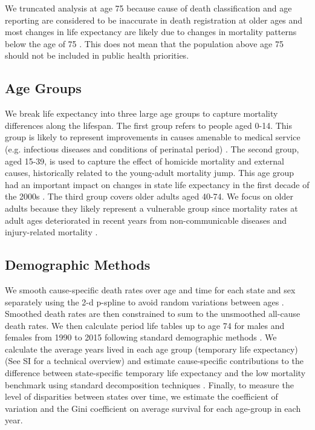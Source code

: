 \documentclass{bmcart}
\begin{document}
We truncated analysis at age 75 because cause of death classification and age reporting are considered to be inaccurate in death registration at older ages \cite{tobias2001} and most changes in life expectancy are likely due to changes in mortality patterns below the age of 75 \cite{Aburto2015}. This does not mean that the population above age 75 should not be included in public health priorities.

\subsection*{Age Groups}

We break life expectancy into three large age groups to capture mortality differences along the lifespan. The first group refers to people aged 0-14. This group is likely to represent improvements in causes amenable to medical service (e.g. infectious diseases and conditions of perinatal period) \cite{canudas2014}. The second group, aged 15-39, is used to capture the effect of homicide mortality and external causes, historically related to the young-adult mortality jump. This age group had an important impact on changes in state life expectancy in the first decade of the 2000s \cite{Aburto2015}. The third group covers older adults aged 40-74. We focus on older adults because they likely represent a vulnerable group since mortality rates at adult ages deteriorated in recent years from non-communicable diseases and injury-related mortality \cite{gonzalez2011health,gomez2016dissonant}.

\subsection*{Demographic Methods}
We smooth cause-specific death rates over age and time for each
state and sex separately using the 2-d p-spline
to avoid random variations between ages \cite{GC2012}. Smoothed death rates are
then constrained to sum to the unsmoothed all-cause death rates. We then calculate period life tables up to
age 74 for males and females from 1990 to 2015 following standard demographic methods \cite{HMDMP}. We calculate the average years lived in each age group (temporary life expectancy) \cite{arriaga1984} (See SI for a technical overview) and estimate cause-specific contributions to the difference between
state-specific temporary life expectancy and  the low mortality benchmark using
 standard decomposition techniques \cite{horiuchi2008}. Finally, to measure the level of disparities between states over time, we estimate the coefficient of variation and the Gini coefficient on average survival for each age-group in each year. 
\end{document}
